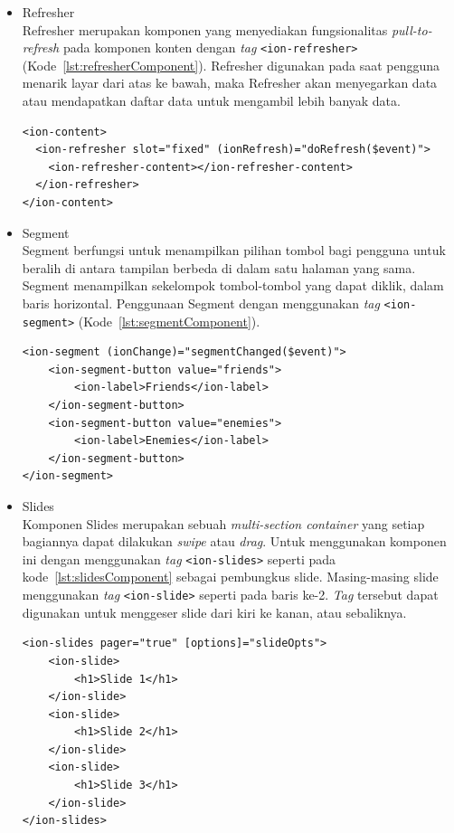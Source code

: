\begin{itemize}
	\item Refresher \\
	Refresher merupakan komponen yang menyediakan fungsionalitas \textit{pull-to-refresh} pada komponen konten dengan \textit{tag} \texttt{<ion-refresher>} (Kode~\ref{lst:refresherComponent}). Refresher digunakan pada saat pengguna menarik layar dari atas ke bawah, maka Refresher akan menyegarkan data atau mendapatkan daftar data untuk mengambil lebih banyak data. 
	
\begin{lstlisting}[label={lst:refresherComponent}, caption=Kode Program dari Refresher]
<ion-content>
  <ion-refresher slot="fixed" (ionRefresh)="doRefresh($event)">
    <ion-refresher-content></ion-refresher-content>
  </ion-refresher>
</ion-content>
\end{lstlisting}
	\item Segment \\
	Segment berfungsi untuk menampilkan pilihan tombol bagi pengguna untuk beralih di antara tampilan berbeda di dalam satu halaman yang sama. Segment menampilkan sekelompok tombol-tombol yang dapat diklik, dalam baris horizontal. Penggunaan Segment dengan menggunakan {\it tag} \texttt{<ion-segment>} (Kode~\ref{lst:segmentComponent}).
	
\begin{lstlisting}[label={lst:segmentComponent}, caption=Kode Program dari Segment]
<ion-segment (ionChange)="segmentChanged($event)">
	<ion-segment-button value="friends">
		<ion-label>Friends</ion-label>
	</ion-segment-button>
	<ion-segment-button value="enemies">
		<ion-label>Enemies</ion-label>
	</ion-segment-button>
</ion-segment>
\end{lstlisting}
	
	\item Slides \\
	Komponen Slides merupakan sebuah \textit{multi-section container} yang setiap bagiannya dapat dilakukan \textit{swipe} atau \textit{drag}. Untuk menggunakan komponen ini dengan menggunakan \textit{tag} \texttt{<ion-slides>} seperti pada kode~\ref{lst:slidesComponent} sebagai pembungkus slide. Masing-masing slide menggunakan \textit{tag} \texttt{<ion-slide>} seperti pada baris ke-2. \textit{Tag} tersebut dapat digunakan untuk menggeser slide dari kiri ke kanan, atau sebaliknya.
	
\begin{lstlisting}[label={lst:slidesComponent}, caption=Kode Program dari Slides]
<ion-slides pager="true" [options]="slideOpts">
	<ion-slide>
		<h1>Slide 1</h1>
	</ion-slide>
	<ion-slide>
		<h1>Slide 2</h1>
	</ion-slide>
	<ion-slide>
		<h1>Slide 3</h1>
	</ion-slide>
</ion-slides>
\end{lstlisting}
	

\end{itemize}
